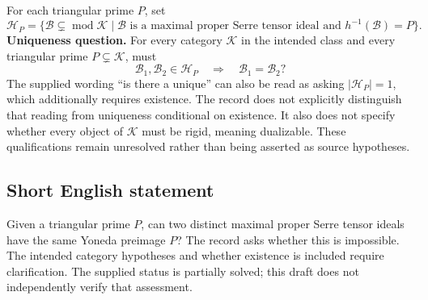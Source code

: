 \documentclass[11pt]{article}
\begin{document}
For each triangular prime \(P\), set
\[
\mathscr H_P=\{\mathcal B\subsetneq\operatorname{mod}\mathcal K\mid
\mathcal B\text{ is a maximal proper Serre tensor ideal and }h^{-1}(\mathcal B)=P\}.
\]
\textbf{Uniqueness question.} For every category \(\mathcal K\) in the intended class and every triangular prime \(P\subsetneq\mathcal K\), must
\[
\mathcal B_1,\mathcal B_2\in\mathscr H_P
\quad\Longrightarrow\quad
\mathcal B_1=\mathcal B_2?
\]
The supplied wording ``is there a unique'' can also be read as asking \(\lvert\mathscr H_P\rvert=1\), which additionally requires existence. The record does not explicitly distinguish that reading from uniqueness conditional on existence. It also does not specify whether every object of \(\mathcal K\) must be rigid, meaning dualizable. These qualifications remain unresolved rather than being asserted as source hypotheses.
\subsection{Short English statement}
Given a triangular prime \(P\), can two distinct maximal proper Serre tensor ideals have the same Yoneda preimage \(P\)? The record asks whether this is impossible. The intended category hypotheses and whether existence is included require clarification. The supplied status is partially solved; this draft does not independently verify that assessment.
\end{document}
